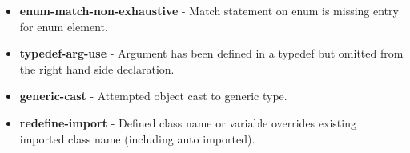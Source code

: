 \documentclass[conc-doc]{subfiles}
\begin{document}
\begin{itemize}
	\item \textbf{enum-match-non-exhaustive} - Match statement on enum is missing entry for enum element.
	\item \textbf{typedef-arg-use} - Argument has been defined in a typedef but omitted from the right hand side declaration.
	\item \textbf{generic-cast} - Attempted object cast to generic type.
	\item \textbf{redefine-import} - Defined class name or variable overrides existing imported class name (including auto imported).
\end{itemize}
\end{document}
